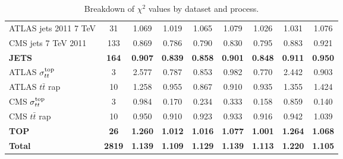 \begin{table}[H]
\begin{center}
{\begin{tabular}{|l|c|c|ccc|cc|c|}
\midrule
ATLAS jets 2011 7 TeV                   &   31 & 1.069 & 1.019 & 1.065 & 1.079 & 1.026 & 1.031 & 1.076 \\
CMS jets 7 TeV 2011                     &  133 & 0.869 & 0.786 & 0.790 & 0.830 & 0.795 & 0.883 & 0.921 \\
\midrule
\bf JETS                                &  \bf 164 & \bf 0.907 & \bf 0.839 & \bf 0.858 & \bf 0.901 & \bf 0.848 & \bf 0.911 & \bf 0.950 \\
\midrule
ATLAS $\sigma_{tt}^{\rm top}$              &    3 & 2.577 & 0.787 & 0.853 & 0.982 & 0.770 & 2.442 & 0.903 \\
ATLAS $t\bar{t}$ rap                    &   10 & 1.258 & 0.955 & 0.867 & 0.910 & 0.935 & 1.355 & 1.424 \\
CMS $\sigma_{tt}^{\rm top}$                &    3 & 0.984 & 0.170 & 0.234 & 0.333 & 0.158 & 0.859 & 0.140 \\
CMS $t\bar{t}$ rap                      &   10 & 0.950 & 0.910 & 0.923 & 0.933 & 0.916 & 0.942 & 1.039 \\ 
\midrule
\bf TOP                                 &  \bf  26 & \bf 1.260 & \bf 1.012 & \bf 1.016 & \bf 1.077 & \bf 1.001 & \bf 1.264 & \bf 1.068 \\ 
\midrule
\bf Total                               & \bf 2819 & \bf 1.139 & \bf 1.109 & \bf 1.129 & \bf 1.139 & \bf 1.113 & \bf 1.220 & \bf 1.105 \\
\bottomrule
\end{tabular}}
\end{center}
\caption{Breakdown of $\chi^2$ values by dataset and process. 
  \label{table:chi2table_covth_global_nlo}
}
  \end{table}
